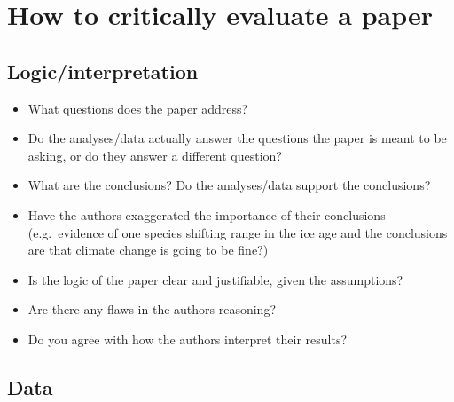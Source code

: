 \documentclass[]{book}
\begin{document}
\section{How to critically evaluate a
paper}\label{how-to-critically-evaluate-a-paper}

\subsection{Logic/interpretation}\label{logicinterpretation}

\begin{itemize}
\item
  What questions does the paper address?
\item
  Do the analyses/data actually answer the questions the paper is meant
  to be asking, or do they answer a different question?
\item
  What are the conclusions? Do the analyses/data support the
  conclusions?
\item
  Have the authors exaggerated the importance of their conclusions
  (e.g.~evidence of one species shifting range in the ice age and the
  conclusions are that climate change is going to be fine?)
\item
  Is the logic of the paper clear and justifiable, given the
  assumptions?
\item
  Are there any flaws in the authors reasoning?
\item
  Do you agree with how the authors interpret their results?
\end{itemize}

\subsection{Data}\label{data}
\end{document}
